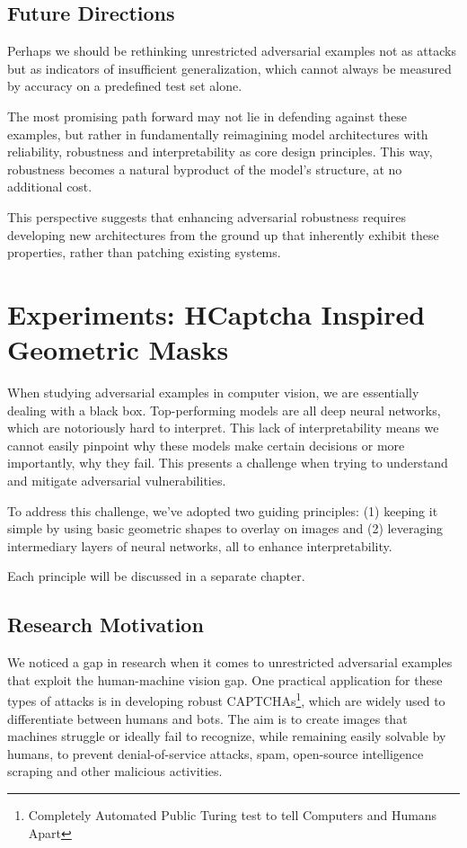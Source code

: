 \documentclass[a4paper, oneside]{discothesis}
\begin{document}
\section{Future Directions}

Perhaps we should be rethinking unrestricted adversarial examples not as attacks but as indicators of insufficient generalization, which cannot always be measured by accuracy on a predefined test set alone.

The most promising path forward may not lie in defending against these examples, but rather in fundamentally reimagining model architectures with reliability, robustness and interpretability as core design principles. This way, robustness becomes a natural byproduct of the model's structure, at no additional cost.

This perspective suggests that enhancing adversarial robustness requires developing new architectures from the ground up that inherently exhibit these properties, rather than patching existing systems.

% 
% 

\chapter{Experiments: HCaptcha Inspired Geometric Masks}

When studying adversarial examples in computer vision, we are essentially dealing with a black box. Top-performing models are all deep neural networks, which are notoriously hard to interpret. This lack of interpretability means we cannot easily pinpoint why these models make certain decisions or more importantly, why they fail. This presents a challenge when trying to understand and mitigate adversarial vulnerabilities.

To address this challenge, we've adopted two guiding principles: (1) keeping it simple by using basic geometric shapes to overlay on images and (2) leveraging intermediary layers of neural networks, all to enhance interpretability.

Each principle will be discussed in a separate chapter.

\section{Research Motivation}

We noticed a gap in research when it comes to unrestricted adversarial examples that exploit the human-machine vision gap. One practical application for these types of attacks is in developing robust CAPTCHAs\footnote{Completely Automated Public Turing test to tell Computers and Humans Apart}, which are widely used to differentiate between humans and bots. The aim is to create images that machines struggle or ideally fail to recognize, while remaining easily solvable by humans, to prevent denial-of-service attacks, spam, open-source intelligence scraping and other malicious activities.
\end{document}
